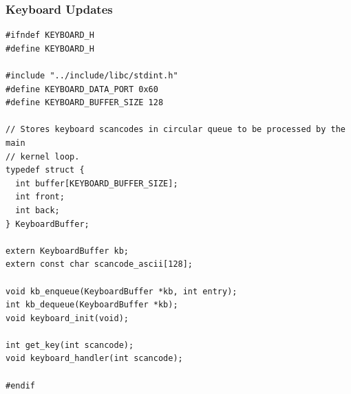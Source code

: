 \documentclass[../main.tex]{subfiles}
\begin{document}
\subsubsection{Keyboard Updates}
\label{apx:keyboard_updates}


\begin{listing}[H]
    \begin{verbatim}
#ifndef KEYBOARD_H
#define KEYBOARD_H

#include "../include/libc/stdint.h"
#define KEYBOARD_DATA_PORT 0x60
#define KEYBOARD_BUFFER_SIZE 128

// Stores keyboard scancodes in circular queue to be processed by the main
// kernel loop.
typedef struct {
  int buffer[KEYBOARD_BUFFER_SIZE];
  int front;
  int back;
} KeyboardBuffer;

extern KeyboardBuffer kb;
extern const char scancode_ascii[128];

void kb_enqueue(KeyboardBuffer *kb, int entry);
int kb_dequeue(KeyboardBuffer *kb);
void keyboard_init(void);

int get_key(int scancode);
void keyboard_handler(int scancode);

#endif
    \end{verbatim}
    \caption{Implementation of \texttt{keyboard.h}}
    \label{lst:keyboard_h}
\end{listing}
\end{document}
